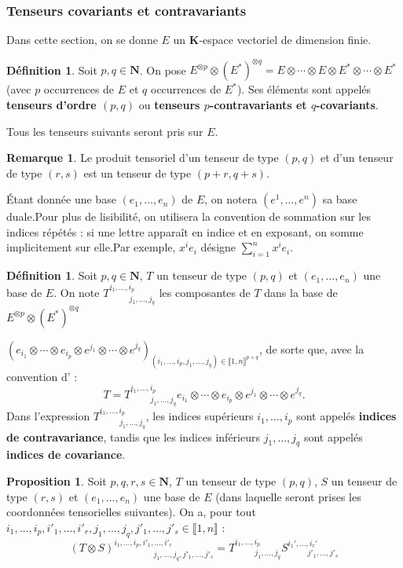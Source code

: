 \documentclass[12pt,a4paper]{article}
\theoremstyle{definition}
\newtheorem{prop}[thm]{Proposition}
\newtheorem{defn}[thm]{Définition}
\newtheorem{rqe}[thm]{Remarque}
\begin{document}
\subsubsection{Tenseurs covariants et contravariants}
Dans cette section, on se donne $E$ un $\mathbf{K}$-espace vectoriel de dimension finie.
\begin{defn}
Soit $p,q\in\mathbf{N}$. On pose $E^{\otimes p}\otimes (E^*)^{\otimes q}=E\otimes\cdots\otimes E\otimes E^*\otimes\cdots\otimes E^*$ (avec $p$ occurrences de $E$ et $q$ occurrences de $E^*$). Ses éléments sont appelés \textbf{tenseurs d'ordre $(p,q)$} ou \textbf{tenseurs $p$-contravariants et $q$-covariants}.
\end{defn}
Tous les tenseurs suivants seront pris sur $E$.
\begin{rqe}
Le produit tensoriel d'un tenseur de type $(p,q)$ et d'un tenseur de type $(r,s)$ est un tenseur de type $(p+r,q+s)$.
\end{rqe}
Étant donnée une base $(e_1,\ldots,e_n)$ de $E$, on notera $\left(e^1,\ldots,e^n\right)$ sa base duale.\newline Pour plus de lisibilité, on utilisera la convention de sommation sur les indices répétés : si une lettre apparaît en indice et en exposant, on somme implicitement sur elle.\newline Par exemple, $x^ie_i$ désigne $\displaystyle\sum\limits_{i=1}^nx^ie_i$.
\begin{defn}
Soit $p,q\in\mathbf{N}$, $T$ un tenseur de type $(p,q)$ et $(e_1,\ldots,e_n)$ une base de $E$. On note $T_{\;\;\qquad j_1,\ldots,j_q}^{i_1,\ldots,i_p}$ les composantes de $T$ dans
la base de $E^{\otimes p}\otimes (E^*)^{\otimes q}$

$\left(e_{i_1}\otimes\cdots\otimes e_{i_p}\otimes e^{j_1}\otimes\cdots\otimes e^{j_q}\right)_{(i_1,\ldots,i_p,j_1,\ldots,j_q)\in\llbracket 1,n\rrbracket^{p+q}}$, de sorte que, avec la convention d' :
$$T=T_{\;\;\qquad j_1,\ldots,j_q}^{i_1,\ldots,i_p}e_{i_1}\otimes\cdots\otimes e_{i_p}\otimes e^{j_1}\otimes\cdots\otimes e^{j_q}.$$
Dans l'expression $T_{\;\;\qquad j_1,\ldots,j_q}^{i_1,\ldots,i_p}$, les indices supérieurs $i_1,\ldots,i_p$ sont appelés \textbf{indices de contravariance}, tandis que les indices inférieurs $j_1,\ldots,j_q$ sont appelés \textbf{indices de covariance}.
\end{defn}
\begin{prop}
Soit $p,q,r,s\in\mathbf{N}$, $T$ un tenseur de type $(p,q)$, $S$ un tenseur de type $(r,s)$ et $(e_1,\ldots,e_n)$ une base de $E$ (dans laquelle seront prises les coordonnées tensorielles suivantes). On a, pour tout $i_1,\ldots,i_p,i'_1,\ldots,i'_r,j_1,\ldots,j_q,j'_1,\ldots,j'_s\in\llbracket 1,n\rrbracket$ :
$$
(T\otimes S)^{i_1,\ldots,i_p,i'_1,\ldots,i'_r}_{\;\;\qquad\;\;\qquad j_1,\ldots,j_q,j'_1,\ldots,j'_s}=T^{i_1,\ldots,i_p}_{\;\;\qquad j_1,\ldots,j_q}S^{i_1',\ldots,i_r'}_{\;\;\qquad j'_1,\ldots,j'_s}
$$
\end{prop}
\end{document}
